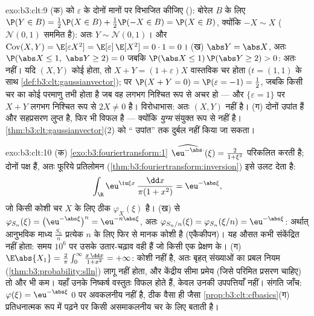 \begin{solution}{exo:b3:clt:9}
(क)  को $\varepsilon$ के दोनों मानों पर विभाजित
कीजिए (): बोरेल $B$ के लिए $\P(Y \in B) =
\frac12\P(X \in B) + \frac12\P(-X \in B) = \P(X \in B)$,
क्योंकि $-X \sim X$ ($\mathcal N(0,1)$ सममित है): अतः $Y
\sim \mathcal N(0,1)$। और $\operatorname{Cov}(X, Y) =
\E[\varepsilon X^2] = \E[\varepsilon]\,\E[X^2] = 0 \cdot 1 =
0$।
(ख) $\abs Y = \abs X$, अतः $\P(\abs X \leq 1,\ \abs Y \geq
2) = 0$ जबकि $\P(\abs X \leq 1)\,\P(\abs Y \geq 2) > 0$:
अतः  नहीं। यदि $(X, Y)$ कोई  होता, तो
$X + Y = (1 + \varepsilon)X$ वास्तविक  चर होता
($t = (1,1)$ के साथ \cref{def:b3:clt:gaussianvector}); पर
$\P(X + Y = 0) = \P(\varepsilon = -1) = \frac12$, जबकि किसी
 चर का कोई परमाणु तभी होता है जब वह लगभग निश्चित रूप
से अचर हो --- और $\{\varepsilon = 1\}$ पर $X + Y$ लगभग
निश्चित रूप से $2X \neq 0$ है। विरोधाभास: अतः $(X, Y)$
 नहीं है।
(ग) दोनों उपांत  हैं और सहप्रसरण लुप्त है, फिर भी
 विफल है --- क्योंकि \emph{युग्म} संयुक्त रूप से
 नहीं है। \cref{thm:b3:clt:gaussianvector}(2) को
`` उपांत'' तक दुर्बल नहीं किया जा सकता।
\end{solution}

\begin{solution}{exo:b3:clt:10}
(क) \cref{exo:b3:fouriertransform:1}
$\widehat{\eu^{-\abs\cdot}}(\xi) = \frac{2}{1 + \xi^2}$
परिकलित करती है; दोनों पक्ष  हैं, अतः फूरिये
प्रतिलोमन (\cref{thm:b3:fouriertransform:inversion}) इसे उलट
देता है:
\[
\int_\R\eu^{\iu\xi x}\,\frac{\dd x}{\pi(1 + x^2)} =
\eu^{-\abs\xi},
\]
जो किसी कोशी चर $X$ के लिए ठीक $\varphi_X(\xi)$ है।
(ख)  से $\varphi_{S_n}(\xi) =
\bigl(\eu^{-\abs\xi}\bigr)^n = \eu^{-n\abs\xi}$, अतः
$\varphi_{S_n/n}(\xi) = \varphi_{S_n}(\xi/n) =
\eu^{-\abs\xi}$: अर्थात् आनुभविक माध्य $\frac{S_n}n$
प्रत्येक $n$ के लिए फिर से मानक कोशी है (एकैकीपन)। यह औसत
कभी संकेंद्रित नहीं होता: समय $10^6$ पर उसके उतार-चढ़ाव
वही हैं जो किसी एक प्रेक्षण के।
(ग) $\E\abs{X_1} = \frac2\pi\int_0^\infty\frac{x\,\dd x}{1 +
x^2} = +\infty$: कोशी   नहीं है, अतः बृहत्
संख्याओं का प्रबल नियम
(\cref{thm:b3:probability:slln}) लागू नहीं होता, और केंद्रीय
सीमा प्रमेय (जिसे परिमित प्रसरण चाहिए) तो और भी कम। यहाँ
उनके निष्कर्ष वस्तुतः विफल होते हैं, केवल उनकी उपपत्तियाँ
नहीं। संगति जाँच: $\varphi(\xi) = \eu^{-\abs\xi}$ $0$ पर
अवकलनीय नहीं है, ठीक वैसा ही जैसा
\cref{prop:b3:clt:cfbasics}(ग) प्रतिधनात्मक रूप में पढ़ने पर
किसी असमाकलनीय चर के लिए बताती है।
\end{solution}

